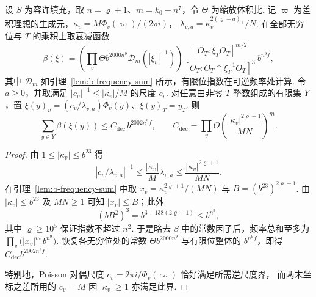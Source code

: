 \begin{lemma}
\label{lem:b-global-frequency-decay}
\emitthmsource
设 $S$ 为容许填充，取 $n=\varrho+1$、$m=k_0-n^7$，令 $\Theta$ 为缩放体积比.
记 $\varpi$ 为差积理想的生成元，$\kappa_v=M\Phi_v(\varpi)/(2\pi i)$，
$\lambda_{v,a}=\kappa_v^{2(\varrho-a)_+}/N$.
在全部无穷位与 $T$ 的乘积上取衰减函数
\[
 \beta(\xi)=
 \left(\prod_v\Theta b^{2000n^9}\mathcal D_m(|\xi_v|^{-1})\right)
 \frac{[O_T:\xi_TO_T]^{m/2}}{[O_T:O_T\cap\xi_T^{-1}O_T]^3}\,b^{n^9 f},
\]
其中 $\mathcal D_m$ 如引理~\ref{lem:b-frequency-sum} 所示，有限位指数在可逆频率处计算.
令 $a\ge0$，并取满足 $|c_v|^{-1}\le|\kappa_v|/M$ 的尺度 $c_v$.
对任意由非零 $T$ 整数组成的有限集 $Y$，置
$\xi(y)_v=(c_v/\lambda_{v,a})\Phi_v(y)$、$\xi(y)_T=y_T$. 则
\[
 \sum_{y\in Y}\beta(\xi(y))
 \le C_{\mathrm{dec}}\,b^{2002n^9 f},\qquad
 C_{\mathrm{dec}}=\prod_v\Theta
          \left(\frac{|\kappa_v|^{2\varrho+1}}{MN}\right)^m .
\]
\end{lemma}
\begin{proof}
由 $1\le|\kappa_v|\le b^{23}$ 得
\[
 |c_v/\lambda_{v,a}|^{-1}
 \le \frac{|\kappa_v|}{M}\lambda_{v,a}
 \le \frac{|\kappa_v|^{2\varrho+1}}{MN}.
\]
在引理~\ref{lem:b-frequency-sum} 中取
$x_v=\kappa_v^{2\varrho+1}/(MN)$ 与 $B=(b^{23})^{2\varrho+1}$.
由 $|\kappa_v|\le b^{23}$ 及 $MN\ge1$ 可知 $|x_v|\le B$；此外
\[
 (bB^2)^3=b^{3+138(2\varrho+1)}\le b^{n^9},
\]
其中 $\varrho\ge10^5$ 保证指数不超过 $n^2$.
于是略去 $\beta$ 中的常数因子后，频率总和至多为
$\prod_v \bigl(|x_v|^m\,b^{n^9}\bigr)$.
恢复各无穷位处的常数 $\Theta b^{2000n^9}$ 与有限位整体的
$b^{n^9f}$，即得 $C_{\mathrm{dec}}b^{2002n^9f}$.

特别地，Poisson 对偶尺度 $c_v=2\pi i/\Phi_v(\varpi)$ 恰好满足所需逆尺度界，
而两末坐标之差所用的 $c_v=M$ 因 $|\kappa_v|\ge1$ 亦满足此界.
\end{proof}

